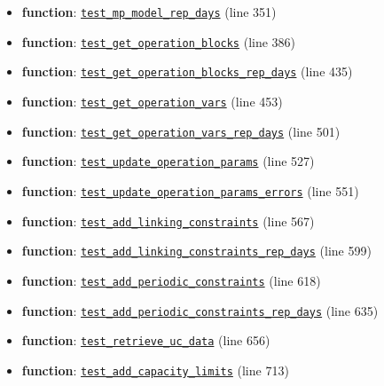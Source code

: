 \documentclass[11pt]{report}
\begin{document}
\begin{itemize}[leftmargin=*]
  \item \textbf{function}: \hyperref[def:pricetaker-tests-test_price_taker_model.py:test_mp_model_rep_days:L351]{\texttt{test\_mp\_model\_rep\_days}} (line 351)
  \item \textbf{function}: \hyperref[def:pricetaker-tests-test_price_taker_model.py:test_get_operation_blocks:L386]{\texttt{test\_get\_operation\_blocks}} (line 386)
  \item \textbf{function}: \hyperref[def:pricetaker-tests-test_price_taker_model.py:test_get_operation_blocks_rep_days:L435]{\texttt{test\_get\_operation\_blocks\_rep\_days}} (line 435)
  \item \textbf{function}: \hyperref[def:pricetaker-tests-test_price_taker_model.py:test_get_operation_vars:L453]{\texttt{test\_get\_operation\_vars}} (line 453)
  \item \textbf{function}: \hyperref[def:pricetaker-tests-test_price_taker_model.py:test_get_operation_vars_rep_days:L501]{\texttt{test\_get\_operation\_vars\_rep\_days}} (line 501)
  \item \textbf{function}: \hyperref[def:pricetaker-tests-test_price_taker_model.py:test_update_operation_params:L527]{\texttt{test\_update\_operation\_params}} (line 527)
  \item \textbf{function}: \hyperref[def:pricetaker-tests-test_price_taker_model.py:test_update_operation_params_errors:L551]{\texttt{test\_update\_operation\_params\_errors}} (line 551)
  \item \textbf{function}: \hyperref[def:pricetaker-tests-test_price_taker_model.py:test_add_linking_constraints:L567]{\texttt{test\_add\_linking\_constraints}} (line 567)
  \item \textbf{function}: \hyperref[def:pricetaker-tests-test_price_taker_model.py:test_add_linking_constraints_rep_days:L599]{\texttt{test\_add\_linking\_constraints\_rep\_days}} (line 599)
  \item \textbf{function}: \hyperref[def:pricetaker-tests-test_price_taker_model.py:test_add_periodic_constraints:L618]{\texttt{test\_add\_periodic\_constraints}} (line 618)
  \item \textbf{function}: \hyperref[def:pricetaker-tests-test_price_taker_model.py:test_add_periodic_constraints_rep_days:L635]{\texttt{test\_add\_periodic\_constraints\_rep\_days}} (line 635)
  \item \textbf{function}: \hyperref[def:pricetaker-tests-test_price_taker_model.py:test_retrieve_uc_data:L656]{\texttt{test\_retrieve\_uc\_data}} (line 656)
  \item \textbf{function}: \hyperref[def:pricetaker-tests-test_price_taker_model.py:test_add_capacity_limits:L713]{\texttt{test\_add\_capacity\_limits}} (line 713)

\end{itemize}
\end{document}
